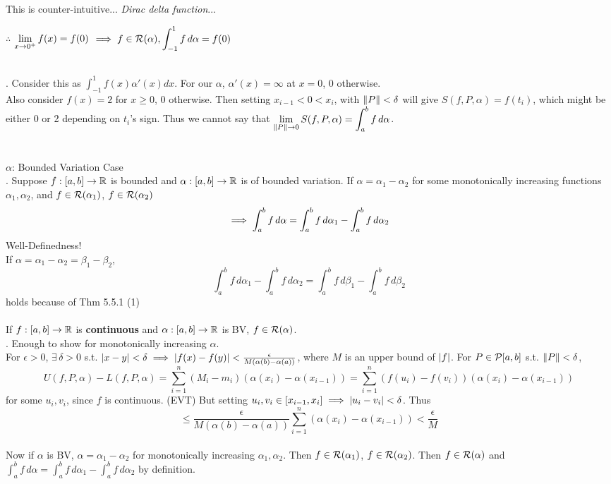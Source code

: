 This is counter-intuitive... \textit{Dirac delta function}...
\begin{center}
	$\therefore$ $\displaystyle\lim_{x\rightarrow0^{+}} f(x) = f(0)$ $\displaystyle \implies f\in \mathcal{R}(\alpha), \int_{-1}^1 f\,d\alpha = f(0)$
\end{center}~\\
\rmk. Consider this as $\int_{-1}^1 f(x)\alpha'(x) dx$. For our $\alpha$, $\alpha'(x) = \infty$ at $x=0$, 0 otherwise.\\
Also consider $f(x) = 2$ for $x\geq 0$, 0 otherwise. Then setting $x_{i-1} < 0 < x_{i}$, with $\left\lVert P\right\rVert < \delta$ will give $S(f, P, \alpha) = f(t_i)$, which might be either 0 or 2 depending on $t_i$'s sign. Thus we cannot say that $\displaystyle \lim_{\left\lVert P\right\rVert\rightarrow0} S(f, P, \alpha) = \int_a^b f\,d\alpha$.\\
\\
\\
$\alpha$: Bounded Variation Case\\
. Suppose $f:[a, b]\rightarrow\mathbb{R}$ is bounded and $\alpha:[a, b]\rightarrow\mathbb{R}$ is of bounded variation. If $\alpha = \alpha_1-\alpha_2$ for some monotonically increasing functions $\alpha_1, \alpha_2$, and $f\in \mathcal{R}(\alpha_1)$, $f\in \mathcal{R}(\alpha_2)$
$$\implies \int_a^b f\, d\alpha = \int_a^b f\,d\alpha_1 - \int_a^b f\,d\alpha_2$$
Well-Definedness!\\
If $\alpha = \alpha_1-\alpha_2 = \beta_1-\beta_2$,
$$\int_a^b f\,d\alpha_1 - \int_a^b f\,d\alpha_2 = \int_a^b f\,d\beta_1 - \int_a^b f\,d\beta_2$$
holds because of Thm 5.5.1 (1)\\
\\
 If $f:[a, b]\rightarrow\mathbb{R}$ is \textbf{continuous} and $\alpha:[a, b]\rightarrow\mathbb{R}$ is BV, $f\in \mathcal{R}(\alpha)$.\\
\pf. Enough to show for monotonically increasing $\alpha$.\\
For $\epsilon > 0$, $\exists\,\delta>0$ s.t. $\left|x-y\right|<\delta \implies \left|f(x)-f(y)\right| <\frac{\epsilon}{M (\alpha(b)-\alpha(a))}$,
where $M$ is an upper bound of $\left|f\right|$. For $P\in \mathcal{P}[a, b]$ s.t. $\left\lVert P\right\rVert<\delta$,
$$U(f, P, \alpha) - L(f, P, \alpha) = \sum_{i=1}^n (M_i-m_i)(\alpha(x_i)-\alpha(x_{i-1})) = \sum_{i=1}^n (f(u_i)-f(v_i))(\alpha(x_i)-\alpha(x_{i-1}))$$
for some $u_i, v_i$, since $f$ is continuous. (EVT)
But setting $u_i, v_i \in [x_{i-1}, x_i] \implies \left|u_i-v_i\right| < \delta$. Thus
$$\leq \frac{\epsilon}{M(\alpha(b)-\alpha(a))}\sum_{i=1}^n (\alpha(x_i)-\alpha(x_{i-1})) < \frac{\epsilon}{M}$$\\
Now if $\alpha$ is BV, $\alpha = \alpha_1-\alpha_2$ for monotonically increasing $\alpha_1, \alpha_2$.
Then $f\in \mathcal{R}(\alpha_1)$, $f\in \mathcal{R}(\alpha_2)$. Then $f\in \mathcal{R}(\alpha)$ and $\int_a^b f\, d\alpha = \int_a^b f\,d\alpha_1 - \int_a^b f\,d\alpha_2$ by definition.
\pagebreak